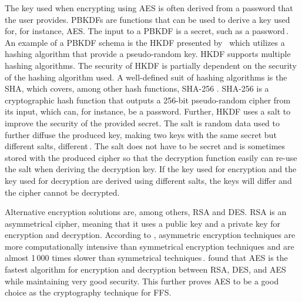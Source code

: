 The key used when encrypting using \gls{AES} is often derived from a password that the user provides. \gls{PBKDF}s are functions that can be used to derive a key used for, for instance, \gls{AES}. The input to a \gls{PBKDF} is a secret, such as a password\,\cite{kodwaniSecurityKeyDerivation2021}. An example of a \gls{PBKDF} schema is the \gls{HKDF} presented by \citeauthor{krawczykCryptographicExtractionKey2010}\,\cite{krawczykCryptographicExtractionKey2010}\cite{krawczykHMACbasedExtractandExpandKey2010} which utilizes a hashing algorithm that provide a pseudo-random key. \gls{HKDF} supports multiple hashing algorithms. The security of \gls{HKDF} is partially dependent on the security of the hashing algorithm used. A well-defined suit of hashing algorithms is the \gls{SHA}, which covers, among other hash functions, \gls{SHA}-256 \cite{hansenUSSecureHash2011}. \gls{SHA}-256 is a cryptographic hash function that outputs a 256-bit pseudo-random cipher from its input, which can, for instance, be a password. Further, \gls{HKDF} uses a salt to improve the security of the provided secret. The salt is random data used to further diffuse the produced key, making two keys with the same secret but different salts, different\,\cite{ariasAddingSaltHashing2021}. The salt does not have to be secret and is sometimes stored with the produced cipher so that the decryption function easily can re-use the salt when deriving the decryption key. If the key used for encryption and the key used for decryption are derived using different salts, the keys will differ and the cipher cannot be decrypted.

Alternative encryption solutions are, among others, \gls{RSA} and \gls{DES}. \gls{RSA} is an asymmetrical cipher, meaning that it uses a public key and a private key for encryption and decryption. According to \citeauthor{mahajanStudyEncryptionAlgorithms2013}, asymmetric encryption techniques are more computationally intensive than symmetrical encryption techniques and are almost 1\,000 times slower than symmetrical techniques\,\cite{mahajanStudyEncryptionAlgorithms2013}. \citeauthor{mahajanStudyEncryptionAlgorithms2013} found that \gls{AES} is the fastest algorithm for encryption and decryption between \gls{RSA}, \gls{DES}, and \gls{AES} while maintaining very good security. This further proves \gls{AES} to be a good choice as the cryptography technique for \gls{FFS}.